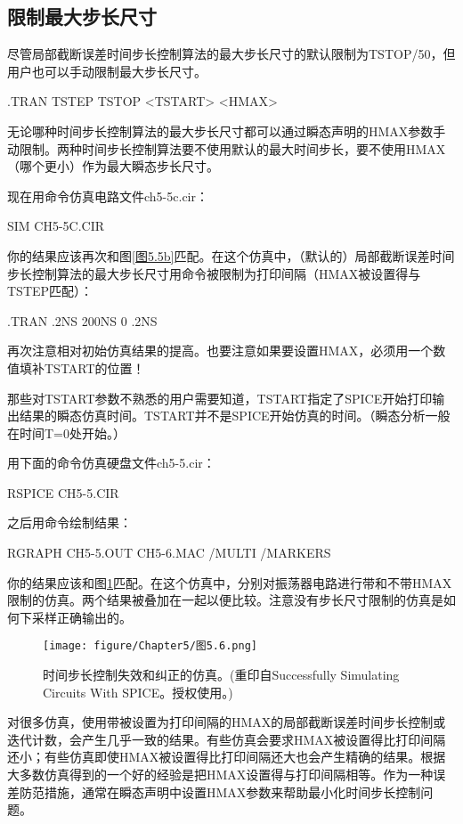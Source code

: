 \subsection{限制最大步长尺寸}
尽管局部截断误差时间步长控制算法的最大步长尺寸的默认限制为TSTOP/50，但用户也可以手动限制最大步长尺寸。

.TRAN TSTEP TSTOP <TSTART> <HMAX>

无论哪种时间步长控制算法的最大步长尺寸都可以通过瞬态声明的HMAX参数手动限制\cite{chap5-2}。两种时间步长控制算法要不使用默认的最大时间步长，要不使用HMAX（哪个更小）作为最大瞬态步长尺寸。

现在用命令仿真电路文件ch5-5c.cir：

SIM CH5-5C.CIR

你的结果应该再次和图\ref{图5.5b}匹配。在这个仿真中，（默认的）局部截断误差时间步长控制算法的最大步长尺寸用命令被限制为打印间隔（HMAX被设置得与TSTEP匹配）：

.TRAN .2NS 200NS 0 .2NS

再次注意相对初始仿真结果的提高。也要注意如果要设置HMAX，必须用一个数值填补TSTART的位置！

那些对TSTART参数不熟悉的用户需要知道，TSTART指定了SPICE开始打印输出结果的瞬态仿真时间。TSTART并不是SPICE开始仿真的时间。（瞬态分析一般在时间T=0处开始。）

用下面的命令仿真硬盘文件ch5-5.cir：

RSPICE CH5-5.CIR

之后用命令绘制结果：

RGRAPH CH5-5.OUT CH5-6.MAC /MULTI /MARKERS

你的结果应该和图\ref{图5.6}匹配。在这个仿真中，分别对振荡器电路进行带和不带HMAX限制的仿真。两个结果被叠加在一起以便比较。注意没有步长尺寸限制的仿真是如何下采样正确输出的。

\begin{figure}[htbp]
\small
    \centering
    \texttt{[image: figure/Chapter5/图5.6.png]}
    \caption{时间步长控制失效和纠正的仿真。(重印自Successfully Simulating Circuits With SPICE。授权使用。)}
    \label{图5.6}
\end{figure}

对很多仿真，使用带被设置为打印间隔的HMAX的局部截断误差时间步长控制或迭代计数，会产生几乎一致的结果。有些仿真会要求HMAX被设置得比打印间隔还小；有些仿真即使HMAX被设置得比打印间隔还大也会产生精确的结果。根据大多数仿真得到的一个好的经验是把HMAX设置得与打印间隔相等。作为一种误差防范措施，通常在瞬态声明中设置HMAX参数来帮助最小化时间步长控制问题。

